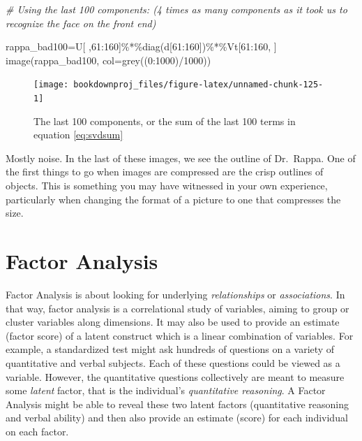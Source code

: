 \documentclass[
]{article}
\newenvironment{Shaded}{\begin{snugshade}}{\end{snugshade}}
\newcommand{\AttributeTok}[1]{\textcolor[rgb]{0.77,0.63,0.00}{#1}}
\newcommand{\CommentTok}[1]{\textcolor[rgb]{0.56,0.35,0.01}{\textit{#1}}}
\newcommand{\DecValTok}[1]{\textcolor[rgb]{0.00,0.00,0.81}{#1}}
\newcommand{\FunctionTok}[1]{\textcolor[rgb]{0.00,0.00,0.00}{#1}}
\newcommand{\NormalTok}[1]{#1}
\newcommand{\OtherTok}[1]{\textcolor[rgb]{0.56,0.35,0.01}{#1}}
\newcommand{\SpecialCharTok}[1]{\textcolor[rgb]{0.00,0.00,0.00}{#1}}
\theoremstyle{definition}
\theoremstyle{definition}
\theoremstyle{definition}
\theoremstyle{definition}
\theoremstyle{remark}
\begin{document}
\begin{Shaded}
\begin{Highlighting}[]
\CommentTok{\# Using the last 100 components: (4 times as many components as it took us to recognize the face on the front end)}

\NormalTok{rappa\_bad100}\OtherTok{=}\NormalTok{U[ ,}\DecValTok{61}\SpecialCharTok{:}\DecValTok{160}\NormalTok{]}\SpecialCharTok{\%*\%}\FunctionTok{diag}\NormalTok{(d[}\DecValTok{61}\SpecialCharTok{:}\DecValTok{160}\NormalTok{])}\SpecialCharTok{\%*\%}\NormalTok{Vt[}\DecValTok{61}\SpecialCharTok{:}\DecValTok{160}\NormalTok{, ]}
\FunctionTok{image}\NormalTok{(rappa\_bad100, }\AttributeTok{col=}\FunctionTok{grey}\NormalTok{((}\DecValTok{0}\SpecialCharTok{:}\DecValTok{1000}\NormalTok{)}\SpecialCharTok{/}\DecValTok{1000}\NormalTok{))}
\end{Highlighting}
\end{Shaded}

\begin{figure}

{\centering \texttt{[image: bookdownproj\_files/figure-latex/unnamed-chunk-125-1]} 

}

\caption{The last 100 components, or the sum of the last 100 terms in equation \eqref{eq:svdsum}}\label{fig:unnamed-chunk-125}
\end{figure}

Mostly noise. In the last of these images, we see the outline of Dr.~Rappa. One of the first things to go when images are compressed are the crisp outlines of objects. This is something you may have witnessed in your own experience, particularly when changing the format of a picture to one that compresses the size.

\hypertarget{fa}{%
\section{Factor Analysis}\label{fa}}

Factor Analysis is about looking for underlying \emph{relationships} or \emph{associations}. In that way, factor analysis is a correlational study of variables, aiming to group or cluster variables along dimensions. It may also be used to provide an estimate (factor score) of a latent construct which is a linear combination of variables. For example, a standardized test might ask hundreds of questions on a variety of quantitative and verbal subjects. Each of these questions could be viewed as a variable. However, the quantitative questions collectively are meant to measure some \emph{latent} factor, that is the individual's \emph{quantitative reasoning}. A Factor Analysis might be able to reveal these two latent factors (quantitative reasoning and verbal ability) and then also provide an estimate (score) for each individual on each factor.
\end{document}
